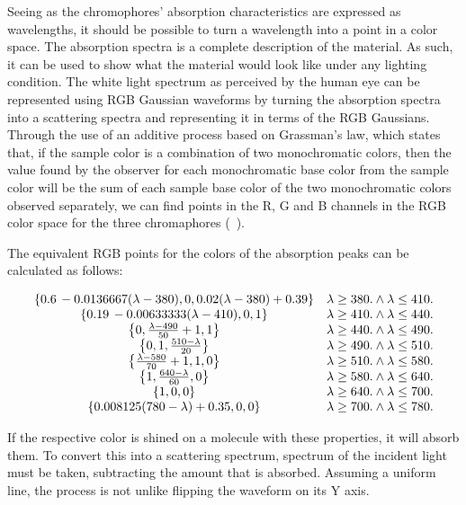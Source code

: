 Seeing as the chromophores' absorption characteristics are expressed as wavelengths, it should be possible to turn a wavelength into a point in a color space. The absorption spectra is a complete description of the material. As such, it can be used to show what the material would look like under any lighting condition. The white light spectrum as perceived by the human eye can be represented using RGB Gaussian waveforms by turning the absorption spectra into a scattering spectra and representing it in terms of the RGB Gaussians. Through the use of an additive process based on Grassman's law, which states that, if the sample color is a combination of two monochromatic colors, then the value found by the observer for each monochromatic base color from the sample color will be the sum of each sample base color of the two monochromatic colors observed separately, we can find points in the R, G and B channels in the RGB color space for the three chromaphores (~\cite{MIHAI2007}).

The equivalent RGB points for the colors of the absorption peaks can be calculated as follows:

\begin{equation}
\begin{array}{cc}
 \{0.6\, -0.0136667 (\lambda -380),0,0.02 (\lambda -380)+0.39\} & \lambda \geq 380.\land \lambda \leq 410. \\
 \{0.19\, -0.00633333 (\lambda -410),0,1\} & \lambda \geq 410.\land \lambda \leq 440. \\
 \left\{0,\frac{\lambda -490}{50}+1,1\right\} & \lambda \geq 440.\land \lambda \leq 490. \\
 \left\{0,1,\frac{510-\lambda }{20}\right\} & \lambda \geq 490.\land \lambda \leq 510. \\
 \left\{\frac{\lambda -580}{70}+1,1,0\right\} & \lambda \geq 510.\land \lambda \leq 580. \\
 \left\{1,\frac{640-\lambda }{60},0\right\} & \lambda \geq 580.\land \lambda \leq 640. \\
 \{1,0,0\} & \lambda \geq 640.\land \lambda \leq 700. \\
 \{0.008125 (780-\lambda )+0.35,0,0\} & \lambda \geq 700.\land \lambda \leq 780. \\
\end{array}
 \\
\end{equation}

If the respective color is shined on a molecule with these properties, it will absorb them. To convert this into a scattering spectrum, spectrum of the incident light must be taken, subtracting the amount that is absorbed. Assuming a uniform line, the process is not unlike flipping the waveform on its Y axis.

